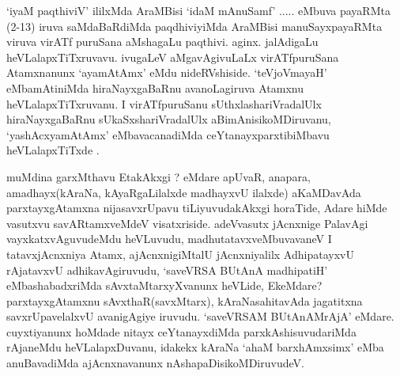 \begin{center}


\end{center}

\begin{artha}
`iyaM paqthiviV' ililxMda AraMBisi `idaM mAnuSamf' ..... eMbuva payaRMta (2-13) iruva saMdaBaRdiMda paqdhiviyiMda AraMBisi manuSayxpayaRMta viruva virATf puruSana aMshagaLu paqthivi. aginx. jalAdigaLu heVLalapxTiTxruvavu. ivugaLeV aMgavAgivuLaLx virATfpuruSana Atamxnanunx `ayamAtAmx' eMdu nideRVshiside. `teVjoVmayaH' eMbamAtiniMda hiraNayxgaBaRnu avanoLagiruva Atamxnu heVLalapxTiTxruvanu. I virATfpuruSanu sUthxlashariVradalUlx hiraNayxgaBaRnu sUkaSxshariVradalUlx aBimAnisikoMDiruvanu, `yashAcxyamAtAmx' eMbavacanadiMda ceYtanayxparxtibiMbavu heVLalapxTiTxde .
\end{artha}

\begin{artha}
 muMdina garxMthavu EtakAkxgi ? eMdare apUvaR, anapara, amadhayx(kAraNa, kAyaRgaLilalxde madhayxvU ilalxde) aKaMDavAda parxtayxgAtamxna nijasavxrUpavu tiLiyuvudakAkxgi horaTide, Adare hiMde vasutxvu savARtamxveMdeV visatxriside. adeVvasutx jAcnxnige PalavAgi vayxkatxvAguvudeMdu heVLuvudu, madhutatavxveMbuvavaneV I tatavxjAcnxniya Atamx, ajAcnxnigiMtalU jAcnxniyalilx AdhipatayxvU rAjatavxvU adhikavAgiruvudu, `saveVRSA BUtAnA madhipatiH' eMbashabadxriMda sAvxtaMtarxyXvanunx heVLide, EkeMdare? parxtayxgAtamxnu sAvxthaR(savxMtarx), kAraNasahitavAda jagatitxna savxrUpavelalxvU avanigAgiye iruvudu. 
 `saveVRSAM BUtAnAMrAjA' eMdare. cuyxtiyanunx hoMdade nitayx ceYtanayxdiMda parxkAshisuvudariMda rAjaneMdu heVLalapxDuvanu, idakekx kAraNa `ahaM barxhAmxsimx' eMba anuBavadiMda ajAcnxnavanunx nAshapaDisikoMDiruvudeV.
\end{artha}

